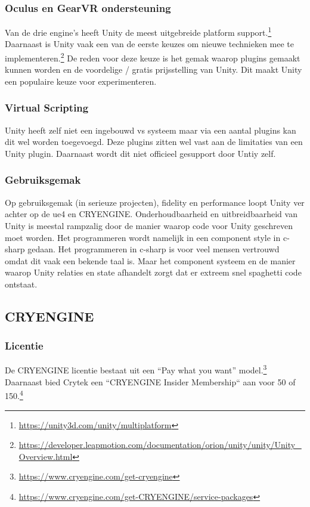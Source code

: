 \subsubsection{Oculus en GearVR ondersteuning}
Van de drie engine’s heeft Unity de meest uitgebreide platform support.\footnote{\url{https://unity3d.com/unity/multiplatform}} Daarnaast is Unity vaak een van de eerste keuzes om nieuwe technieken mee te implementeren.\footnote{\url{https://developer.leapmotion.com/documentation/orion/unity/unity/Unity_Overview.html}} De reden voor deze keuze is het gemak waarop plugins gemaakt kunnen worden en de voordelige / gratis prijsstelling van Unity. Dit maakt Unity een populaire keuze voor experimenteren.

\subsubsection{Virtual Scripting}
Unity heeft zelf niet een ingebouwd \gls{vs} systeem maar via een aantal plugins kan dit wel worden toegevoegd. Deze plugins zitten wel vast aan de limitaties van een Unity plugin. Daarnaast wordt dit niet officieel gesupport door Untiy zelf.

\subsubsection{Gebruiksgemak}
Op gebruiksgemak (in serieuze projecten), fidelity en performance loopt Unity ver achter op de \gls{ue4} en CRYENGINE. Onderhoudbaarheid en uitbreidbaarheid van Unity is meestal rampzalig door de manier waarop code voor Unity geschreven moet worden. Het programmeren wordt namelijk in een component style in c-sharp gedaan. Het programmeren in c-sharp is voor veel mensen vertrouwd omdat dit vaak een bekende taal is. Maar het component systeem en de manier waarop Unity relaties en state afhandelt zorgt dat er extreem snel spaghetti code ontstaat. 

\subsection{CRYENGINE}
\subsubsection{Licentie}
De CRYENGINE licentie bestaat uit een “Pay what you want” model.\footnote{\url{https://www.cryengine.com/get-cryengine}} Daarnaast bied Crytek een “CRYENGINE Insider Membership“ aan voor 50 of 150.\footnote{\url{https://www.cryengine.com/get-CRYENGINE/service-packages}} 

